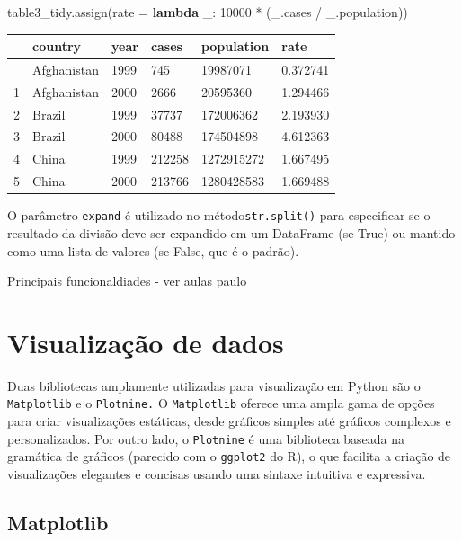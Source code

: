 \documentclass[
  portuguese,
  letterpaper,
  DIV=11,
  numbers=noendperiod]{scrreprt}
\newenvironment{Shaded}{\begin{snugshade}}{\end{snugshade}}
\newcommand{\DecValTok}[1]{\textcolor[rgb]{0.68,0.00,0.00}{#1}}
\newcommand{\KeywordTok}[1]{\textcolor[rgb]{0.00,0.23,0.31}{\textbf{#1}}}
\newcommand{\NormalTok}[1]{\textcolor[rgb]{0.00,0.23,0.31}{#1}}
\newcommand{\OperatorTok}[1]{\textcolor[rgb]{0.37,0.37,0.37}{#1}}
\theoremstyle{definition}
\theoremstyle{remark}
\begin{document}
\begin{Shaded}
\begin{Highlighting}[]
\NormalTok{table3\_tidy.assign(rate }\OperatorTok{=} \KeywordTok{lambda}\NormalTok{ \_: }\DecValTok{10000} \OperatorTok{*}\NormalTok{ (\_.cases }\OperatorTok{/}\NormalTok{ \_.population))}
\end{Highlighting}
\end{Shaded}

\begin{longtable}[]{@{}llllll@{}}
\toprule\noalign{}
& country & year & cases & population & rate \\
\midrule\noalign{}
\endhead
\bottomrule\noalign{}
\endlastfoot
0 & Afghanistan & 1999 & 745 & 19987071 & 0.372741 \\
1 & Afghanistan & 2000 & 2666 & 20595360 & 1.294466 \\
2 & Brazil & 1999 & 37737 & 172006362 & 2.193930 \\
3 & Brazil & 2000 & 80488 & 174504898 & 4.612363 \\
4 & China & 1999 & 212258 & 1272915272 & 1.667495 \\
5 & China & 2000 & 213766 & 1280428583 & 1.669488 \\
\end{longtable}

O parâmetro \texttt{expand} é utilizado no método\texttt{str.split()}
para especificar se o resultado da divisão deve ser expandido em um
DataFrame (se True) ou mantido como uma lista de valores (se False, que
é o padrão).

Principais funcionaldiades - ver aulas paulo

\section{Visualização de dados}\label{visualizauxe7uxe3o-de-dados}

Duas bibliotecas amplamente utilizadas para visualização em Python são o
\texttt{Matplotlib} e o \texttt{Plotnine.} O \texttt{Matplotlib} oferece
uma ampla gama de opções para criar visualizações estáticas, desde
gráficos simples até gráficos complexos e personalizados. Por outro
lado, o \texttt{Plotnine} é uma biblioteca baseada na gramática de
gráficos (parecido com o \texttt{ggplot2} do R), o que facilita a
criação de visualizações elegantes e concisas usando uma sintaxe
intuitiva e expressiva.

\subsection{Matplotlib}\label{matplotlib}
\end{document}
